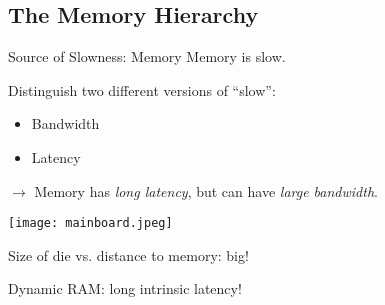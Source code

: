 \documentclass[english,compress]{beamer}
\begin{document}
\subsection[Memory]{The Memory Hierarchy}
\begin{frame}{Source of Slowness: Memory}
  Memory is slow.
  \medskip

  Distinguish two different versions of ``slow'':
  \begin{itemize}
    \item Bandwidth
    \item Latency
  \end{itemize}
  $\rightarrow$ Memory has \emph{long latency}, but can have
  \emph{large bandwidth}.

  \begin{center}
  \texttt{[image: mainboard.jpeg]}
  \end{center}

  Size of die vs. distance to memory: big!

  \medskip
  Dynamic RAM: long intrinsic latency!

\end{frame}
\end{document}
